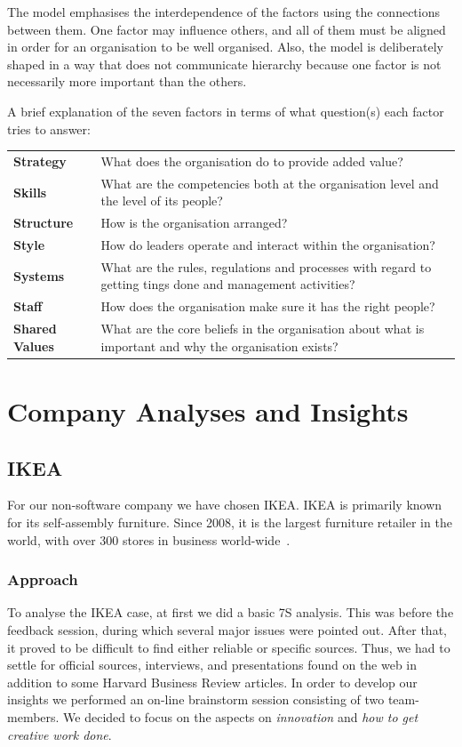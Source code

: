 The model emphasises the interdependence of the factors using the connections between them.
One factor may influence others, and all of them must be aligned in order for an organisation to be well organised.
Also, the model is deliberately shaped in a way that does not communicate hierarchy because one factor is not necessarily more important than the others.

A brief explanation of the seven factors in terms of what question(s) each factor tries to answer:

\noindent
\begin{tabular}{>{\bfseries}L{0,2\textwidth} L{0,8\textwidth}}
    Strategy        & What does the organisation do to provide added value? \\
    Skills          & What are the competencies both at the organisation level and the level of its people?\\
    Structure       & How is the organisation arranged?\\
    Style           & How do leaders operate and interact within the organisation?\\
    Systems         & What are the rules, regulations and processes with regard to getting tings done and management activities?\\
    Staff           & How does the organisation make sure it has the right people?\\
    Shared Values   & What are the core beliefs in the organisation about what is important and why the organisation exists?\\
\end{tabular}

\section{Company Analyses and Insights}

\subsection{IKEA}
For our non-software company we have chosen IKEA.
IKEA is primarily known for its self-assembly furniture.
Since 2008, it is the largest furniture retailer in the world, with over 300 stores in business world-wide~\citep{interikea}.

\subsubsection{Approach}
To analyse the IKEA case, at first we did a basic 7S analysis.
This was before the feedback session, during which several major issues were pointed out.
After that, it proved to be difficult to find either reliable or specific sources.
Thus, we had to settle for official sources, interviews, and presentations found on the web in addition to some Harvard Business Review articles.
In order to develop our insights we performed an on-line brainstorm session consisting of two team-members.
We decided to focus on the aspects on \emph{innovation} and \emph{how to get creative work done}.

